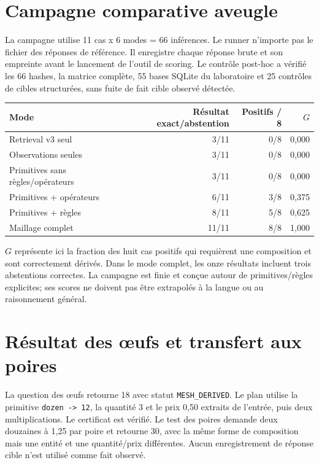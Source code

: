 \documentclass[11pt,a4paper]{book}
\begin{document}
\section{Campagne comparative aveugle}
La campagne utilise 11 cas x 6 modes = 66 inférences. Le runner n'importe pas le fichier des réponses de référence. Il enregistre chaque réponse brute et son empreinte avant le lancement de l'outil de scoring. Le contrôle post-hoc a vérifié les 66 hashes, la matrice complète, 55 bases SQLite du laboratoire et 25 contrôles de cibles structurées, sans fuite de fait cible observé détectée.

\begin{center}
\begin{tabular}{lrrr}
\toprule
Mode & Résultat exact/abstention & Positifs / 8 & $G$ \\
\midrule
Retrieval v3 seul & 3/11 & 0/8 & 0,000 \\
Observations seules & 3/11 & 0/8 & 0,000 \\
Primitives sans règles/opérateurs & 3/11 & 0/8 & 0,000 \\
Primitives + opérateurs & 6/11 & 3/8 & 0,375 \\
Primitives + règles & 8/11 & 5/8 & 0,625 \\
Maillage complet & 11/11 & 8/8 & 1,000 \\
\bottomrule
\end{tabular}
\end{center}

$G$ représente ici la fraction des huit cas positifs qui requièrent une composition et sont correctement dérivés. Dans le mode complet, les onze résultats incluent trois abstentions correctes. La campagne est finie et conçue autour de primitives/règles explicites; ses scores ne doivent pas être extrapolés à la langue ou au raisonnement général.

\section{Résultat des œufs et transfert aux poires}
La question des œufs retourne 18 avec statut \texttt{MESH\_DERIVED}. Le plan utilise la primitive \texttt{dozen -> 12}, la quantité 3 et le prix 0,50 extraits de l'entrée, puis deux multiplications. Le certificat est vérifié. Le test des poires demande deux douzaines à 1,25 par poire et retourne 30, avec la même forme de composition mais une entité et une quantité/prix différentes. Aucun enregistrement de réponse cible n'est utilisé comme fait observé.
\end{document}
